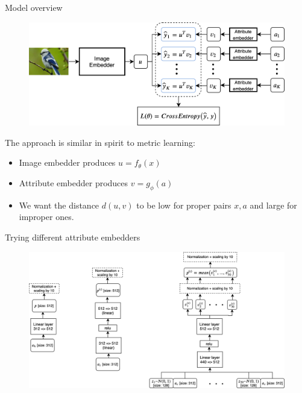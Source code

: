 \documentclass[10pt]{beamer}
\begin{document}
\begin{frame}{Model overview}
    \begin{figure}
        \centering
        \includegraphics[width=\textwidth]{images/model-overview}
    \end{figure}
    
    \pause The approach is similar in spirit to metric learning:
    \begin{itemize}
        \item\pause Image embedder produces $u = f_\theta(x)$
        \item\pause Attribute embedder produces $v = g_\phi(a)$
        \item\pause We want the distance $d(u,v)$ to be low for proper pairs $x,a$ and large for improper ones.
    \end{itemize}
\end{frame}


\begin{frame}{Trying different attribute embedders}
\begin{figure}
    \centering
    \includegraphics[width=\textwidth]{images/embedders}
\end{figure}
\end{frame}
\end{document}
